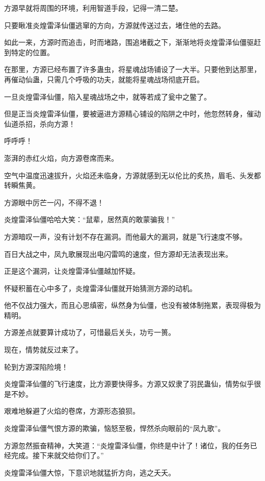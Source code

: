 \begin{this_body}
方源早就将周围的环境，利用智道手段，记得一清二楚。

只要瞅准炎煌雷泽仙僵逃窜的方向，方源就传送过去，堵住他的去路。

如此一来，方源时而追击，时而堵路，围追堵截之下，渐渐地将炎煌雷泽仙僵驱赶到特定的位置。

在那里，方源已经布置了许多蛊虫，将星魂战场铺设了一大半。只要他到达那里，再催动仙蛊，只需几个呼吸的功夫，就能将星魂战场彻底开启。

一旦炎煌雷泽仙僵，陷入星魂战场之中，就等若成了瓮中之鳖了。

但是正当炎煌雷泽仙僵，要被逼进方源精心铺设的陷阱之中时，他忽然转身，催动仙道杀招，杀向方源！

呼呼呼！

澎湃的赤红火焰，向方源卷席而来。

空气中温度迅速拔升，火焰还未临身，方源就感到无以伦比的炙热，眉毛、头发都转瞬焦黄。

方源眼中厉芒一闪，不得不退！

炎煌雷泽仙僵哈哈大笑：“鼠辈，居然真的敢蒙骗我！”

方源暗叹一声，没有计划不存在漏洞。而他最大的漏洞，就是飞行速度不够。

百日大战之中，凤九歌展现出电闪雷鸣的速度，但方源却无法表现出来。

正是这个漏洞，让炎煌雷泽仙僵越加怀疑。

怀疑积蓄在心中多了，炎煌雷泽仙僵就开始猜测方源的动机。

他不仅战力强大，而且心思缜密，纵然身为仙僵，也没有被体制拖累，表现得极为精明。

方源差点就要算计成功了，可惜最后关头，功亏一篑。

现在，情势就反过来了。

轮到方源深陷险境！

炎煌雷泽仙僵的飞行速度，比方源要快得多。方源又奴隶了羽民蛊仙，情势似乎很是不妙。

艰难地躲避了火焰的卷席，方源形态狼狈。

炎煌雷泽仙僵气恨方源的欺骗，恼怒至极，悍然杀向眼前的“凤九歌”。

方源忽然振奋精神，大笑道：“炎煌雷泽仙僵，你终是中计了！诸位，我的任务已经完成。接下来就交给你们了。”

炎煌雷泽仙僵大惊，下意识地就猛折方向，逃之夭夭。

\end{this_body}

